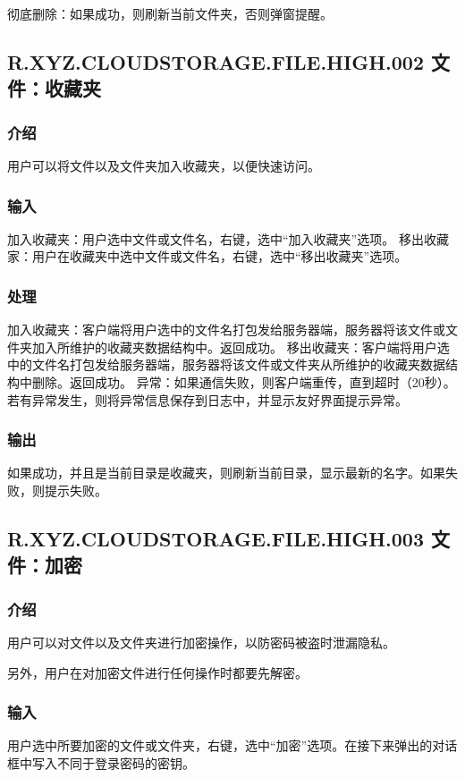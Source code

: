 彻底删除：如果成功，则刷新当前文件夹，否则弹窗提醒。



\subsection{R.XYZ.CLOUDSTORAGE.FILE.HIGH.002 文件：收藏夹}

\subsubsection{介绍} 
用户可以将文件以及文件夹加入收藏夹，以便快速访问。

\subsubsection{输入} 
加入收藏夹：用户选中文件或文件名，右键，选中“加入收藏夹”选项。
移出收藏家：用户在收藏夹中选中文件或文件名，右键，选中“移出收藏夹”选项。

\subsubsection{处理}
加入收藏夹：客户端将用户选中的文件名打包发给服务器端，服务器将该文件或文件夹加入所维护的收藏夹数据结构中。返回成功。
移出收藏夹：客户端将用户选中的文件名打包发给服务器端，服务器将该文件或文件夹从所维护的收藏夹数据结构中删除。返回成功。
异常：如果通信失败，则客户端重传，直到超时（20秒）。
若有异常发生，则将异常信息保存到日志中，并显示友好界面提示异常。

\subsubsection{输出}
如果成功，并且是当前目录是收藏夹，则刷新当前目录，显示最新的名字。如果失败，则提示失败。



\subsection{R.XYZ.CLOUDSTORAGE.FILE.HIGH.003 文件：加密}

\subsubsection{介绍}
用户可以对文件以及文件夹进行加密操作，以防密码被盗时泄漏隐私。 

另外，用户在对加密文件进行任何操作时都要先解密。

\subsubsection{输入} 
用户选中所要加密的文件或文件夹，右键，选中“加密”选项。在接下来弹出的对话框中写入不同于登录密码的密钥。

